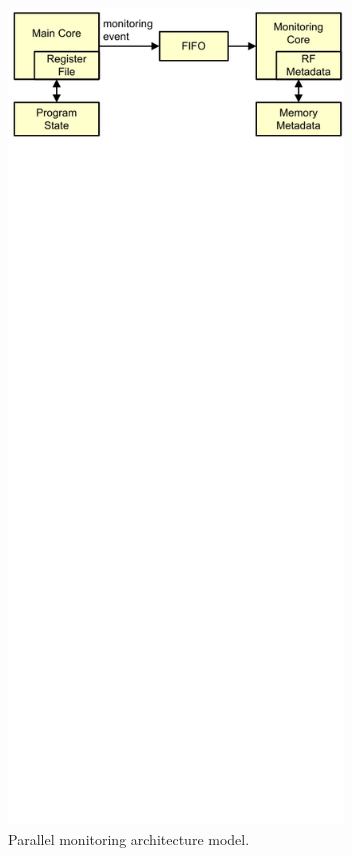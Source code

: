 \begin{figure}
  \begin{center}
    \includegraphics[width=3.5in]{figs/arch.pdf}
    \caption{Parallel monitoring architecture model.}
    \label{fig:background.monitoring.arch} 
  \end{center}
\end{figure}

